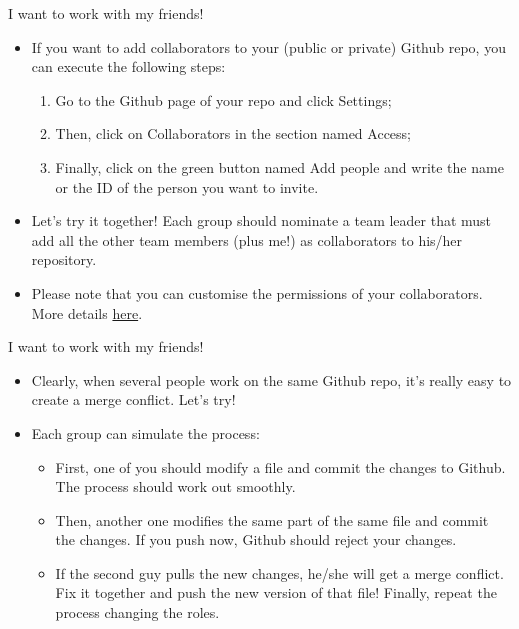\documentclass[
hyperref={bookmarks=false},
xcolor={dvipsnames,svgnames*,x11names*}, 
12pt
]{beamer}
\begin{document}
\begin{frame}{I want to work with my friends!}
\vspace{-0.5cm}
\begin{itemize}
\itemsep 3ex
\item If you want to add collaborators to your (public or private) Github repo, you can execute the following steps:
\begin{enumerate}
\item Go to the Github page of your repo and click Settings; 
\item Then, click on Collaborators in the section named Access; 
\item Finally, click on the green button named Add people and write the name or the ID of the person you want to invite.  
\end{enumerate}
\item Let's try it together! Each group should nominate a team leader that must add all the other team members (plus me!) as collaborators to his/her repository. 
\item Please note that you can customise the permissions of your collaborators. More details \href{https://docs.github.com/en/organizations/managing-user-access-to-your-organizations-repositories/repository-roles-for-an-organization}{here}. 
\end{itemize}
\end{frame}

\begin{frame}[fragile]{I want to work with my friends!}
\vspace{-0.5cm}
\begin{itemize}
\itemsep 2ex
\item Clearly, when several people work on the same Github repo, it's really easy to create a merge conflict. Let's try! 
\item Each group can simulate the process: 
\begin{itemize}
\item First, one of you should modify a file and commit the changes to Github. The process should work out smoothly. 
\item Then, another one modifies the same part of the same file and commit the changes. If you push now, Github should reject your changes. 
\item If the second guy pulls the new changes, he/she will get a merge conflict. Fix it together and push the new version of that file! Finally, repeat the process changing the roles. 
\end{itemize}
\end{itemize}
\end{frame}
\end{document}
